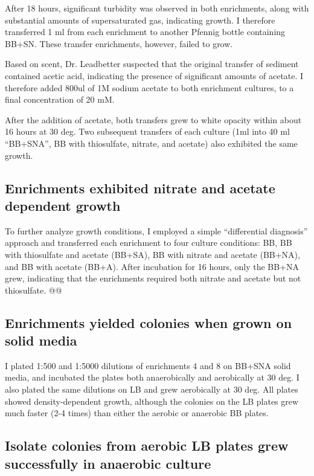 \documentclass{article}
\begin{document}
After 18 hours, significant turbidity was observed in both
enrichments, along with substantial amounts of supersaturated gas,
indicating growth.  I therefore transferred 1 ml from each enrichment
to another Pfennig bottle containing BB+SN.  These transfer
enrichments, however, failed to grow.

Based on scent, Dr. Leadbetter suspected that the original transfer of
sediment contained acetic acid, indicating the presence of significant
amounts of acetate.  I therefore added 800ul of 1M sodium acetate to
both enrichment cultures, to a final concentration of 20 mM.

After the addition of acetate, both transfers grew to white opacity
within about 16 hours at 30 deg.  Two subsequent transfers of each
culture (1ml into 40 ml ``BB+SNA'', BB with thiosulfate, nitrate, and
acetate) also exhibited the same growth.

\subsection*{Enrichments exhibited nitrate and acetate dependent growth}

To further analyze growth conditions, I employed a simple
``differential diagnosis'' approach and transferred each enrichment to
four culture conditions: BB, BB with thiosulfate and acetate (BB+SA),
BB with nitrate and acetate (BB+NA), and BB with acetate (BB+A).
After incubation for 16 hours, only the BB+NA grew, indicating that
the enrichments required both nitrate and acetate but not
thiosulfate. @@

\subsection*{Enrichments yielded colonies when grown on solid media}

I plated 1:500 and 1:5000 dilutions of enrichments 4 and 8 on BB+SNA
solid media, and incubated the plates both anaerobically and
aerobically at 30 deg.  I also plated the same dilutions on LB and
grew aerobically at 30 deg.  All plates showed density-dependent growth,
although the colonies on the LB plates grew much faster (2-4 times)
than either the aerobic or anaerobic BB plates.

\subsection*{Isolate colonies from aerobic LB plates grew successfully
  in anaerobic culture}
\end{document}
